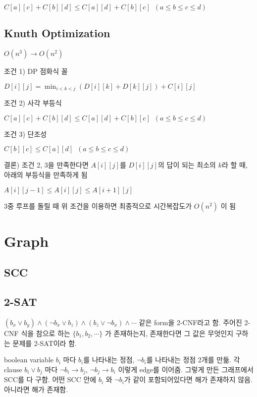 \documentclass[10pt,landscape,a4paper,twocolumn]{article}
\begin{document}
$C[a][c] + C[b][d] \leq C[a][d] + C[b][c] \phantom{1} (a \leq b \leq c \leq d)$

\subsection{Knuth Optimization}

$O(n^{3}) \to O(n^{2})$

조건 1) DP 점화식 꼴

$D[i][j] = \min_{i<k<j}( D[i][k] + D[k][j] ) + C[i][j]$

조건 2) 사각 부등식

$C[a][c] + C[b][d] \leq C[a][d] + C[b][c] \phantom{1} (a \leq b \leq c \leq d)$

조건 3) 단조성

$C[b][c] \leq C[a][d] \phantom{1} (a \leq b \leq c \leq d)$

결론) 조건 2, 3을 만족한다면  $A[i][j]$를 $D[i][j]$의 답이 되는 최소의 $k$라 할 때, 아래의 부등식을 만족하게 됨

$A[i][j-1] \leq A[i][j] \leq A[i+1][j]$

3중 루프를 돌릴 때 위 조건을 이용하면 최종적으로 시간복잡도가 $O(n^{2})$ 이 됨

\section{Graph}

\subsection{SCC}


\subsection{2-SAT}

$(b_{x} \lor b_{y}) \land (\neg b_{x} \lor b_{z}) \land (b_{z} \lor \neg b_{x}) \land \cdots$ 같은 form을 2-CNF라고 함. 주어진 2-CNF 식을 참으로 하는 $\{ b_1, b_2, \cdots \}$ 가 존재하는지, 존재한다면 그 값은 무엇인지 구하는 문제를 2-SAT이라 함.

boolean variable $b_{i}$ 마다 $b_{i}$를 나타내는 정점, $\neg b_{i} $를 나타내는 정점 2개를 만듦. 각 clause $b_{i} \lor b_{j}$ 마다 $\neg b_{i} \to b_{j}$, $\neg b_{j} \to b_{i}$ 이렇게 edge를 이어줌. 그렇게 만든 그래프에서 SCC를 다 구함. 어떤 SCC 안에 $b_{i}$ 와 $\neg b_{i}$가 같이 포함되어있다면 해가 존재하지 않음. 아니라면 해가 존재함.
\end{document}
